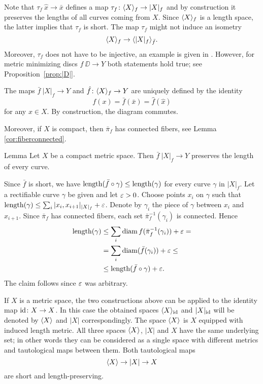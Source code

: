 \documentclass{article}
\begin{document}
Note that $\tau_f\: \hat x\to \bar x$ defines a map $\tau_f\: \<X\>_f\zz\to |X|_f$ and by construction it preserves the lengths of
all curves coming from $X$.
Since $\langle X\rangle_f$ is a length space, the latter implies that $\tau_f$ is short.
The map $\tau_f$ might not induce an isometry
\[\langle X\rangle_f\to\langle|X|_f\rangle_{\bar f}.\]
Moreover, $\tau_f$ does not have to be injective, an example is given in \cite[4.2]{petrunin-intrinisic}.
However, for metric minimizing discs $f\:\DD\to Y$ both statements hold true; see
Proposition~\ref{prop:|D|}.

The maps $\bar f\:|X|_f\to Y$ and $ \hat f\colon\langle X\rangle_f\to Y$ are uniquely defined by the identity
\[f(x)=\bar f(\bar x)=  \hat f( \hat x)\] for any $x\in X$.
By construction, the diagram commutes.

Moreover, if $X$ is compact, then $\bar\pi_f$ has connected fibers, see Lemma \ref{cor:fiberconnected}.

\begin{thm}{Lemma}\label{lem:lengthpres}
Let $X$ be a compact metric space. 
Then $\bar f\:|X|_f\to Y$ preserves the length of every curve.
\end{thm}

Since $\bar f$ is short, we have $\mathop{\rm length}\nolimits(\bar f\circ\gamma)\leq \mathop{\rm length}\nolimits(\gamma)$ for every curve $\gamma$ in $|X|_f$.
Let a rectifiable curve $\gamma$ be given and let $\varepsilon>0$. Choose points $x_i$ on $\gamma$ such that $\mathop{\rm length}\nolimits(\gamma)\leq\sum_i |x_i,x_{i+1}|_{|X|_f}+\varepsilon$.
Denote by $\gamma_i$ the piece of $\gamma$ between $x_i$ and $x_{i+1}$. Since $\bar\pi_f$ has connected fibers, each set $\bar\pi_f^{-1}(\gamma_i)$
is connected. Hence 
\begin{align*}
\mathop{\rm length}\nolimits(\gamma)&\leq \sum_i \mathop{\rm diam}\nolimits f(\bar\pi_f^{-1}(\gamma_i))+\varepsilon=
\\
&=\sum_i \mathop{\rm diam}\nolimits(\bar f(\gamma_i))+\varepsilon\leq
\\
&\leq\mathop{\rm length}\nolimits(\bar f\circ\gamma)+\varepsilon.
\end{align*}
The claim follows since $\varepsilon$ was arbitrary.
\qeds

If $X$ is a metric space, the two constructions above can be applied to the identity map $\mathrm{id}\colon X\to X$.
In this case the obtained spaces $\langle X\rangle_{\mathrm{id}}$ and $|X|_{\mathrm{id}}$ will be denoted by $\langle X\rangle$ and $|X|$ correspondingly.
The space $\langle X\rangle$ is $X$ equipped with induced length metric.
All three spaces $\langle X\rangle$, $|X|$ and $X$ have the same underlying set;
in other words they can be considered as a single space with different metrics and tautological maps between them.
Both tautological maps 
\[\langle X\rangle\to |X|\to X\]
are short and length-preserving.
\end{document}
